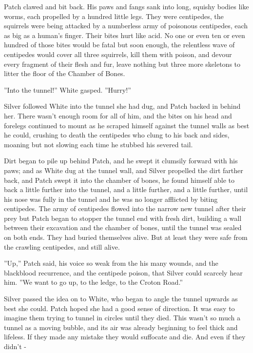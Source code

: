 \documentclass[12pt]{book}
\begin{document}
 Patch clawed and bit back. His paws and fangs sank into long, squishy bodies like worms, each propelled by a hundred little legs. They were centipedes, the squirrels were being attacked by a numberless army of poisonous centipedes, each as big as a human's finger. Their bites hurt like acid. No one or even ten or even hundred of those bites would be fatal %
 but soon enough, the relentless wave of centipedes would cover all three squirrels, kill them with poison, and devour every fragment of their flesh and fur, leave nothing but three more skeletons to litter the floor of the Chamber of Bones.\par
 ''Into the tunnel!'' White gasped. ''Hurry!''\par
 Silver followed White into the tunnel she had dug, and Patch backed in behind her. There wasn't enough room for all of him, and the bites on his head and forelegs continued to mount as he scraped himself against the tunnel walls as best he could, crushing to death the centipedes who clung to his back and sides, moaning but not slowing each time he stubbed his severed tail.\par
 Dirt began to pile up behind Patch, and he swept it clumsily forward with his paws; and as White dug at the tunnel wall, and Silver propelled the dirt farther back, and Patch swept it into the chamber of bones, he found himself able to back a little further into the tunnel, and a little further, and a little further, until his nose was fully in the tunnel and he was no longer afflicted by biting centipedes. The army of centipedes flowed into the narrow new tunnel after their prey %
 but Patch began to stopper the tunnel end with fresh dirt, building a wall between their excavation and the chamber of bones, until the tunnel was sealed on both ends. They had buried themselves alive. But at least they were safe from the crawling centipedes, and still alive.\par
 ''Up,'' Patch said, his voice so weak from the his many wounds, and the blackblood recurrence, and the centipede poison, that Silver could scarcely hear him. ''We want to go up, to the ledge, to the Croton Road.''\par
 Silver passed the idea on to White, who began to angle the tunnel upwards as best she could. Patch hoped she had a good sense of direction. It was easy to imagine them trying to tunnel in circles until they died. This wasn't so much a tunnel as a moving bubble, and its air was already beginning to feel thick and lifeless. If they made any mistake they would suffocate and die. And even if they didn't -\par
\end{document}
